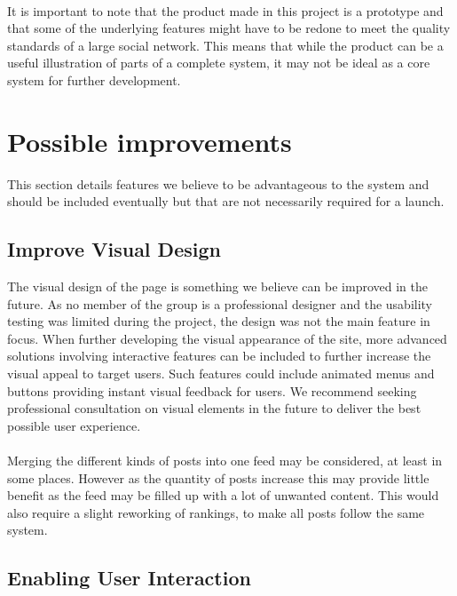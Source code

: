 \paragraph{} It is important to note that the product made in this project is a prototype and that some of the underlying features might have to be redone to meet the quality standards of a large social network. This means that while the product can be a useful illustration of parts of a complete system, it may not be ideal as a core system for further development.

\section{Possible improvements}
\label{sec:FurtherImprovements}

This section details features we believe to be advantageous to the system and should be included eventually but that are not necessarily required for a launch.

\subsection{Improve Visual Design}
\label{subsec:FurtherImprovementsVisDesign}

The visual design of the page is something we believe can be improved in the future. As no member of the group is a professional designer and the usability testing was limited during the project, the design was not the main feature in focus. When further developing the visual appearance of the site, more advanced solutions involving interactive features can be included to further increase the visual appeal to target users. Such features could include animated menus and buttons providing instant visual feedback for users. We recommend seeking professional consultation on visual elements in the future to deliver the best possible user experience.
\paragraph{} Merging the different kinds of posts into one feed may be considered, at least in some places. However as the quantity of posts increase this may provide little benefit as the feed may be filled up with a lot of unwanted content. This would also require a slight reworking of rankings, to make all posts follow the same system.

\subsection{Enabling User Interaction}
\label{subsec:FurtherImprovementsInteraction}

